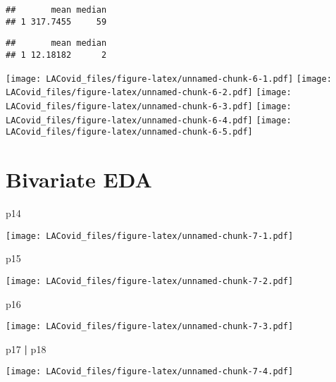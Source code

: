 \documentclass[
]{article}
\newenvironment{Shaded}{\begin{snugshade}}{\end{snugshade}}
\newcommand{\NormalTok}[1]{#1}
\newcommand{\OperatorTok}[1]{\textcolor[rgb]{0.81,0.36,0.00}{\textbf{#1}}}
\newcommand{\StringTok}[1]{\textcolor[rgb]{0.31,0.60,0.02}{#1}}
\begin{document}
\begin{verbatim}
##       mean median
## 1 317.7455     59
\end{verbatim}

\begin{verbatim}
##       mean median
## 1 12.18182      2
\end{verbatim}

\texttt{[image: LACovid\_files/figure-latex/unnamed-chunk-6-1.pdf]}
\texttt{[image: LACovid\_files/figure-latex/unnamed-chunk-6-2.pdf]}
\texttt{[image: LACovid\_files/figure-latex/unnamed-chunk-6-3.pdf]}
\texttt{[image: LACovid\_files/figure-latex/unnamed-chunk-6-4.pdf]}
\texttt{[image: LACovid\_files/figure-latex/unnamed-chunk-6-5.pdf]}

\hypertarget{bivariate-eda}{%
\section{Bivariate EDA}\label{bivariate-eda}}

\begin{Shaded}
\begin{Highlighting}[]
\NormalTok{p14 }
\end{Highlighting}
\end{Shaded}

\texttt{[image: LACovid\_files/figure-latex/unnamed-chunk-7-1.pdf]}

\begin{Shaded}
\begin{Highlighting}[]
\NormalTok{p15  }
\end{Highlighting}
\end{Shaded}

\texttt{[image: LACovid\_files/figure-latex/unnamed-chunk-7-2.pdf]}

\begin{Shaded}
\begin{Highlighting}[]
\NormalTok{p16}
\end{Highlighting}
\end{Shaded}

\texttt{[image: LACovid\_files/figure-latex/unnamed-chunk-7-3.pdf]}

\begin{Shaded}
\begin{Highlighting}[]
\NormalTok{p17 }\OperatorTok{|}\StringTok{ }\NormalTok{p18}
\end{Highlighting}
\end{Shaded}

\texttt{[image: LACovid\_files/figure-latex/unnamed-chunk-7-4.pdf]}
\end{document}
